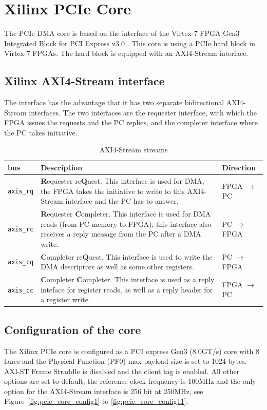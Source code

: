 \section{Xilinx PCIe Core}
The PCIe DMA core is based on the interface of the Virtex-7 FPGA Gen3 Integrated Block for PCI Express v3.0 \cite{pg023}. This core is using a PCIe hard block in Virtex-7 FPGAs. The hard block is equipped with an AXI4-Stream interface.
\subsection{Xilinx AXI4-Stream interface}
The interface has the advantage that it has two separate bidirectional AXI4-Stream interfaces. The two interfaces are the requester interface, with which the FPGA issues the requests and the PC replies, and the completer interface where the PC takes initiative.
\begin{table}[H]
	\centering
	\begin{tabularx}{\textwidth}{|l|X|l|}
	\hline
	  \textbf{bus} & \textbf{Description} &\textbf{Direction}\\
	\hline
	\texttt{axis\_rq} & \textbf{R}equester re\textbf{Q}uest. This interface is used for DMA, the FPGA takes the initiative to write to this AXI4-Stream interface and the PC has to answer. &FPGA $\rightarrow$ PC\\
	\hline
	\texttt{axis\_rc} & \textbf{R}equester \textbf{C}ompleter. This interface is used for DMA reads (from PC memory to FPGA), this interface also receives a reply message from the PC after a DMA write.&PC $\rightarrow$ FPGA\\
	\hline
	\texttt{axis\_cq} & \textbf{C}ompleter re\textbf{Q}uest. This interface is used to write the DMA descriptors as well as some other registers. & PC $\rightarrow$ FPGA\\
	\hline
	\texttt{axis\_cc} & \textbf{C}ompleter \textbf{C}ompleter. This interface is used as a reply inteface for register reads, as well as a reply header for a register write. & FPGA $\rightarrow$ PC\\
	\hline
	
	\end{tabularx}
	\caption{AXI4-Stream streams}\label{tab:axi_streams}
\end{table}
\subsection{Configuration of the core}
The Xilinx PCIe core is configured as a PCI express Gen3 (8.0GT/s) core with 8 lanes and the Physical Function (PF0) max payload size is set to 1024 bytes. AXI-ST Frame Straddle is disabled and the client tag is enabled. All other options are set to default, the reference clock frequency is 100MHz and the only option for the AXI4-Stream interface is 256 bit at 250MHz, see Figure~\ref{fig:pcie_core_config1} to \ref{fig:pcie_core_config11}.
\newpage

